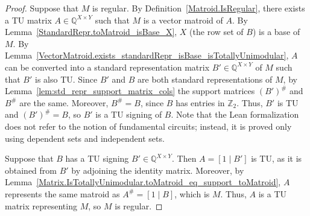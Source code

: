 \begin{proof}
    \leanok
    Suppose that $M$ is regular. By Definition~\ref{Matroid.IsRegular}, there exists a TU matrix $A \in \mathbb{Q}^{X \times Y}$ such that $M$ is a vector matroid of $A$. By Lemma~\ref{StandardRepr.toMatroid_isBase_X}, $X$ (the row set of $B$) is a base of $M$. By Lemma~\ref{VectorMatroid.exists_standardRepr_isBase_isTotallyUnimodular}, $A$ can be converted into a standard representation matrix $B' \in \mathbb{Q}^{X \times Y}$ of $M$ such that $B'$ is also TU. Since $B'$ and $B$ are both standard representations of $M$, by Lemma~\ref{lem:std_repr_support_matrix_cols} the support matrices $(B')^{\#}$ and $B^{\#}$ are the same. Moreover, $B^{\#} = B$, since $B$ has entries in $\mathbb{Z}_{2}$. Thus, $B'$ is TU and $(B')^{\#} = B$, so $B'$ is a TU signing of $B$. Note that the Lean formalization does not refer to the notion of fundamental circuits; instead, it is proved only using dependent sets and independent sets.

    Suppose that $B$ has a TU signing $B' \in \mathbb{Q}^{X \times Y}$. Then $A = [1 \mid B']$ is TU, as it is obtained from $B'$ by adjoining the identity matrix. Moreover, by Lemma~\ref{Matrix.IsTotallyUnimodular.toMatroid_eq_support_toMatroid}, $A$ represents the same matroid as $A^{\#} = [1 \mid B]$, which is $M$. Thus, $A$ is a TU matrix representing $M$, so $M$ is regular.
\end{proof}
